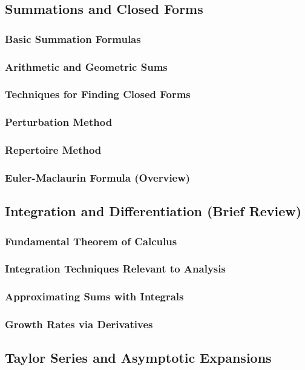\subsection{Summations and Closed Forms}
\subsubsection{Basic Summation Formulas}
\subsubsection{Arithmetic and Geometric Sums}
\subsubsection{Techniques for Finding Closed Forms}
\subsubsection{Perturbation Method}
\subsubsection{Repertoire Method}
\subsubsection{Euler-Maclaurin Formula (Overview)}

\subsection{Integration and Differentiation (Brief Review)}
\subsubsection{Fundamental Theorem of Calculus}
\subsubsection{Integration Techniques Relevant to Analysis}
\subsubsection{Approximating Sums with Integrals}
\subsubsection{Growth Rates via Derivatives}

\subsection{Taylor Series and Asymptotic Expansions}
